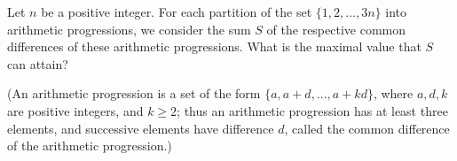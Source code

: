 Let $n$ be a positive integer.  For each partition of the set $\{1,2,\dots,3n\}$ into arithmetic  progressions,  we  consider  the  sum $S$ of  the  respective  common differences  of  these  arithmetic  progressions.   What  is  the  maximal  value that $S$ can attain?

(An arithmetic progression is a set of the form $\{a,a+d,\dots,a+kd\}$,  where $a,d,k$ are positive integers, and $k\geqslant 2$; thus an arithmetic progression has at least three elements, and successive elements have difference $d$,  called the common difference of the arithmetic progression.)